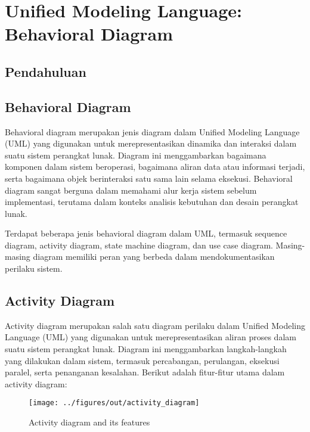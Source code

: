 \chapter{Unified Modeling Language: Behavioral Diagram}

\section{Pendahuluan}


\section{Behavioral Diagram}

Behavioral diagram merupakan jenis diagram dalam Unified Modeling Language (UML) yang digunakan untuk merepresentasikan dinamika dan interaksi dalam suatu sistem perangkat lunak. Diagram ini menggambarkan bagaimana komponen dalam sistem beroperasi, bagaimana aliran data atau informasi terjadi, serta bagaimana objek berinteraksi satu sama lain selama eksekusi. Behavioral diagram sangat berguna dalam memahami alur kerja sistem sebelum implementasi, terutama dalam konteks analisis kebutuhan dan desain perangkat lunak.

Terdapat beberapa jenis behavioral diagram dalam UML, termasuk sequence diagram, activity diagram, state machine diagram, dan use case diagram. Masing-masing diagram memiliki peran yang berbeda dalam mendokumentasikan perilaku sistem.


\section{Activity Diagram}

Activity diagram merupakan salah satu diagram perilaku dalam Unified Modeling Language (UML) yang digunakan untuk merepresentasikan aliran proses dalam suatu sistem perangkat lunak. Diagram ini menggambarkan langkah-langkah yang dilakukan dalam sistem, termasuk percabangan, perulangan, eksekusi paralel, serta penanganan kesalahan. Berikut adalah fitur-fitur utama dalam activity diagram:


\begin{figure}
		\centering
		\texttt{[image: ../figures/out/activity\_diagram]}
		\caption{Activity diagram and its features}
		\label{fig:activity_diagram}
\end{figure}

